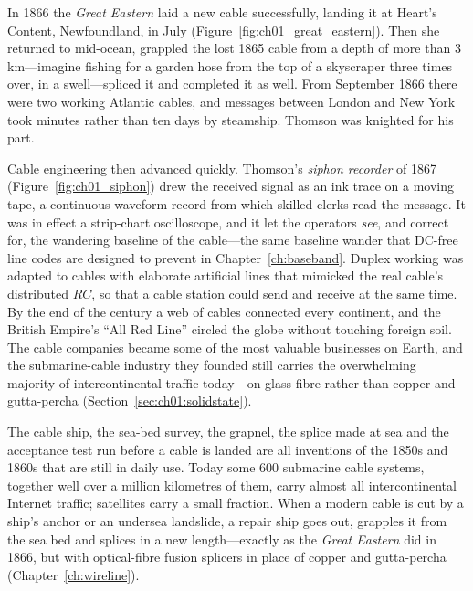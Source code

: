 In 1866 the \emph{Great Eastern} laid a new cable successfully, landing it at Heart's Content,
Newfoundland, in July (Figure~\ref{fig:ch01_great_eastern}). Then she returned to mid-ocean, grappled
the lost 1865 cable from a depth of more than 3\,km---imagine fishing for a garden hose from the top
of a skyscraper three times over, in a swell---spliced it and completed it as well. From September
1866 there were two working Atlantic cables, and messages between London and New York took minutes
rather than ten days by steamship. Thomson was knighted for his part.

Cable engineering then advanced quickly. Thomson's \emph{siphon recorder} of 1867
(Figure~\ref{fig:ch01_siphon}) drew the received signal as an ink trace on a moving tape, a continuous
waveform record from which skilled clerks read the message. It was in effect a strip-chart
oscilloscope, and it let the operators \emph{see}, and correct for, the wandering baseline of the
cable---the same baseline wander that DC-free line codes are designed to prevent in
Chapter~\ref{ch:baseband}. Duplex working was adapted to cables with elaborate artificial lines that
mimicked the real cable's distributed $RC$, so that a cable station could send and receive at the
same time. By the end of the century a web of cables connected every continent, and the British
Empire's ``All Red Line'' circled the globe without touching foreign soil. The cable companies became
some of the most valuable businesses on Earth, and the submarine-cable industry they founded still
carries the overwhelming majority of intercontinental traffic today---on glass fibre rather than
copper and gutta-percha (Section~\ref{sec:ch01:solidstate}).

\begin{inpractice}
The cable ship, the sea-bed survey, the grapnel, the splice made at sea and the acceptance test run
before a cable is landed are all inventions of the 1850s and 1860s that are still in daily use.
Today some 600 submarine cable systems, together well over a million kilometres of them, carry
almost all intercontinental Internet traffic; satellites carry a small fraction. When a modern cable
is cut by a ship's anchor or an undersea landslide, a repair ship goes out, grapples it from the sea
bed and splices in a new length---exactly as the \emph{Great Eastern} did in 1866, but with
optical-fibre fusion splicers in place of copper and gutta-percha (Chapter~\ref{ch:wireline}).
\end{inpractice}

